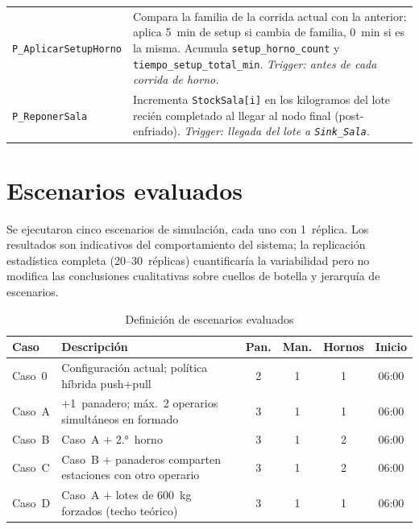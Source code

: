 \documentclass[12pt]{article}
\begin{document}
\begin{table}[H]
\begin{tabularx}{\textwidth}{p{3.4cm}X}
\rowcolor{tabrow}\texttt{P\_Aplicar\-SetupHorno} &
Compara la familia de la corrida actual con la anterior: aplica 5~min de setup si cambia de familia, 0~min si es la misma. Acumula \texttt{setup\_horno\_count} y \texttt{tiempo\_setup\_total\_min}. \textit{Trigger: antes de cada corrida de horno.} \\
\texttt{P\_Reponer\-Sala} &
Incrementa \texttt{StockSala[i]} en los kilogramos del lote recién completado al llegar al nodo final (post-enfriado). \textit{Trigger: llegada del lote a \texttt{Sink\_Sala}.} \\
\bottomrule
\end{tabularx}
\end{table}


\newpage
\section{Escenarios evaluados}

Se ejecutaron cinco escenarios de simulación, cada uno con 1~réplica. Los resultados son indicativos del comportamiento del sistema; la replicación estadística completa (20--30~réplicas) cuantificaría la variabilidad pero no modifica las conclusiones cualitativas sobre cuellos de botella y jerarquía de escenarios.

\begin{table}[H]
\centering
\caption{Definición de escenarios evaluados}
\label{tab:escenarios-tec}
\renewcommand{\arraystretch}{1.3}
\begin{tabularx}{\textwidth}{lXcccc}
\toprule
\rowcolor{tabhead}
\color{white}\textbf{Caso} &
\color{white}\textbf{Descripción} &
\color{white}\textbf{Pan.} &
\color{white}\textbf{Man.} &
\color{white}\textbf{Hornos} &
\color{white}\textbf{Inicio} \\
\midrule
\rowcolor{tabrow} Caso~0 & Configuración actual; política híbrida push+pull & 2 & 1 & 1 & 06:00 \\
Caso~A & +1~panadero; máx.~2 operarios simultáneos en formado & 3 & 1 & 1 & 06:00 \\
\rowcolor{tabrow} Caso~B & Caso~A $+$ 2.°~horno & 3 & 1 & 2 & 06:00 \\
Caso~C & Caso~B $+$ panaderos comparten estaciones con otro operario & 3 & 1 & 2 & 06:00 \\
\rowcolor{tabrow} Caso~D & Caso~A $+$ lotes de 600~kg forzados (techo teórico) & 3 & 1 & 1 & 06:00 \\
\bottomrule
\end{tabularx}
\end{table}
\end{document}
